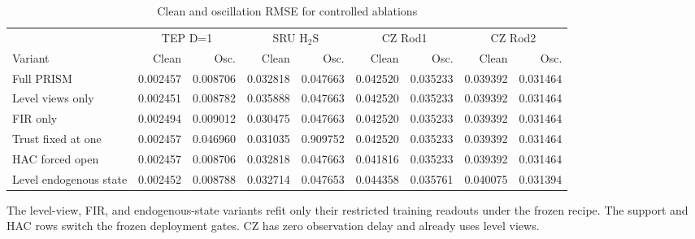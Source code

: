 \begin{table}[!t]
\centering
\caption{Clean and oscillation RMSE for controlled ablations}
\label{tab:architecture-ablation}
\small\setlength{\tabcolsep}{3.5pt}
\begin{tabular}{lrrrrrrrr}
\hline
 & \multicolumn{2}{c}{TEP D=1} & \multicolumn{2}{c}{SRU $\mathrm{H_2S}$} & \multicolumn{2}{c}{CZ Rod1} & \multicolumn{2}{c}{CZ Rod2} \\
\cline{2-3}\cline{4-5}\cline{6-7}\cline{8-9}
Variant & Clean & Osc. & Clean & Osc. & Clean & Osc. & Clean & Osc. \\
\hline
Full PRISM & 0.002457 & 0.008706 & 0.032818 & 0.047663 & 0.042520 & 0.035233 & 0.039392 & 0.031464 \\
Level views only & 0.002451 & 0.008782 & 0.035888 & 0.047663 & 0.042520 & 0.035233 & 0.039392 & 0.031464 \\
FIR only & 0.002494 & 0.009012 & 0.030475 & 0.047663 & 0.042520 & 0.035233 & 0.039392 & 0.031464 \\
Trust fixed at one & 0.002457 & 0.046960 & 0.031035 & 0.909752 & 0.042520 & 0.035233 & 0.039392 & 0.031464 \\
HAC forced open & 0.002457 & 0.008706 & 0.032818 & 0.047663 & 0.041816 & 0.035233 & 0.039392 & 0.031464 \\
Level endogenous state & 0.002452 & 0.008788 & 0.032714 & 0.047653 & 0.044358 & 0.035761 & 0.040075 & 0.031394 \\
\hline
\end{tabular}
\par\smallskip
\parbox{0.96\textwidth}{\footnotesize The level-view, FIR, and endogenous-state variants refit only their restricted training readouts under the frozen recipe. The support and HAC rows switch the frozen deployment gates. CZ has zero observation delay and already uses level views.}
\end{table}
